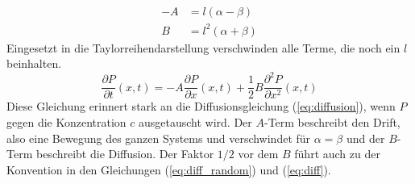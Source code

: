\documentclass[a4paper, 12pt]{scrartcl}
\begin{document}
\begin{align}
  - A & = l (\alpha - \beta) \\
  B & = l^2 (\alpha + \beta)
\end{align}
Eingesetzt in die Taylorreihendarstellung verschwinden alle Terme, die noch ein $l$ beinhalten.
\begin{equation}
  \frac{\partial P}{\partial t} (x, t) = - A \frac{\partial P}{\partial x}(x, t) + \frac{1}{2} B \frac{\partial^2 P}{\partial x^2} (x, t)
\end{equation}
Diese Gleichung erinnert stark an die Diffusionsgleichung (\ref{eq:diffusion}), wenn $P$ gegen die Konzentration $c$ ausgetauscht wird. Der $A$-Term beschreibt den Drift, also eine Bewegung des ganzen Systems und verschwindet für $\alpha = \beta$ und der $B$-Term beschreibt die Diffusion. Der Faktor $1/2$ vor dem $B$ führt auch zu der Konvention in den Gleichungen (\ref{eq:diff_random}) und (\ref{eq:diff}).
\end{document}

